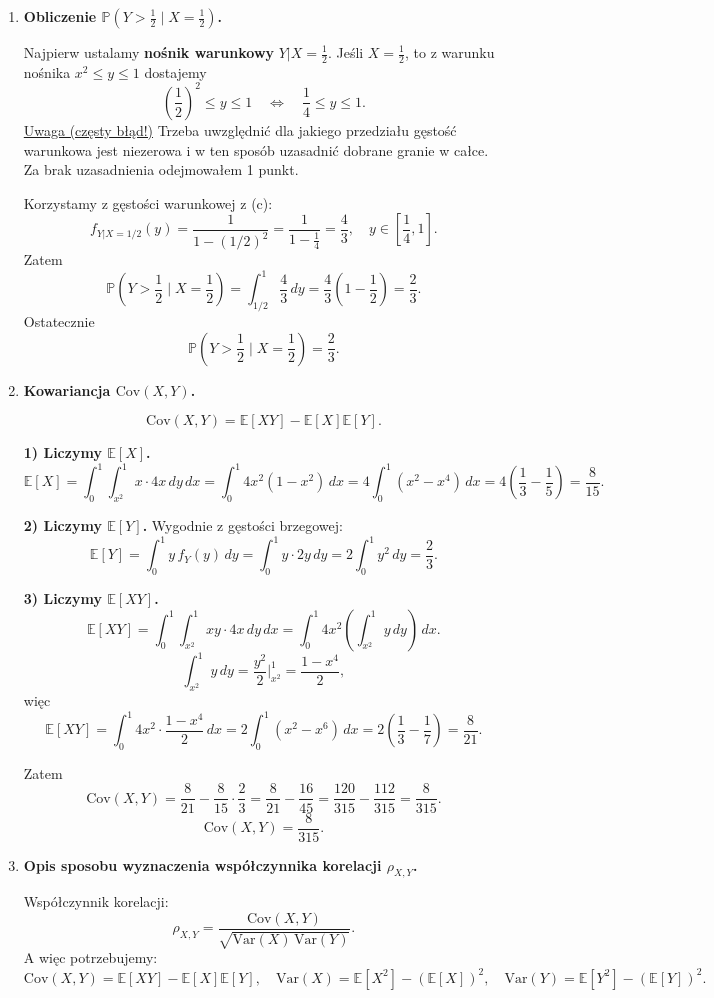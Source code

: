\documentclass[polish, 10pt]{extarticle}
\begin{document}
\begin{enumerate}
\item[d)] \textbf{Obliczenie $\mathbb{P}\!\left(Y>\frac12\mid X=\frac12\right)$.}

Najpierw ustalamy \textbf{nośnik warunkowy} $Y|X=\tfrac12$.
Jeśli $X=\tfrac12$, to z warunku nośnika $x^2\le y\le 1$ dostajemy
\[
\left(\frac12\right)^2\le y\le 1 \quad\Longleftrightarrow\quad \frac14\le y\le 1.
\]
\underline{Uwaga (częsty błąd!)} Trzeba uwzględnić dla jakiego przedziału gęstość warunkowa jest niezerowa i w ten sposób uzasadnić dobrane granie w całce. Za brak uzasadnienia odejmowałem 1 punkt.

Korzystamy z gęstości warunkowej z (c):
\[
f_{Y|X=1/2}(y)=\frac{1}{1-(1/2)^2}=\frac{1}{1-\frac14}=\frac{4}{3},
\quad y\in\left[\frac14,1\right].
\]
Zatem
\[
\mathbb{P}\!\left(Y>\frac12\mid X=\frac12\right)
=\int_{1/2}^{1} \frac{4}{3}\,dy
=\frac{4}{3}\left(1-\frac12\right)=\frac{2}{3}.
\]
Ostatecznie
\[
\boxed{\mathbb{P}\!\left(Y>\frac12\mid X=\frac12\right)=\frac{2}{3}.}
\]

\item[e)] \textbf{Kowariancja $\mathrm{Cov}(X,Y)$.}

\[
\mathrm{Cov}(X,Y)=\mathbb{E}[XY]-\mathbb{E}[X]\mathbb{E}[Y].
\]

\smallskip
\textbf{1) Liczymy $\mathbb{E}[X]$.}
\[
\mathbb{E}[X]=\int_0^1\int_{x^2}^{1} x\cdot 4x\,dy\,dx
=\int_0^1 4x^2(1-x^2)\,dx
=4\int_0^1 (x^2-x^4)\,dx
=4\left(\frac13-\frac15\right)=\frac{8}{15}.
\]

\smallskip
\textbf{2) Liczymy $\mathbb{E}[Y]$.} Wygodnie z gęstości brzegowej:
\[
\mathbb{E}[Y]=\int_0^1 y\,f_Y(y)\,dy=\int_0^1 y\cdot 2y\,dy
=2\int_0^1 y^2\,dy=\frac{2}{3}.
\]

\smallskip
\textbf{3) Liczymy $\mathbb{E}[XY]$.}
\[
\mathbb{E}[XY]=\int_0^1\int_{x^2}^{1} xy\cdot 4x\,dy\,dx
=\int_0^1 4x^2\left(\int_{x^2}^{1} y\,dy\right)\,dx.
\]
\[
\int_{x^2}^{1} y\,dy=\frac{y^2}{2}\Big|_{x^2}^{1}=\frac{1-x^4}{2},
\]
więc
\[
\mathbb{E}[XY]=\int_0^1 4x^2\cdot \frac{1-x^4}{2}\,dx
=2\int_0^1 (x^2-x^6)\,dx
=2\left(\frac13-\frac17\right)=\frac{8}{21}.
\]

\smallskip
Zatem
\[
\mathrm{Cov}(X,Y)=\frac{8}{21}-\frac{8}{15}\cdot\frac{2}{3}
=\frac{8}{21}-\frac{16}{45}
=\frac{120}{315}-\frac{112}{315}
=\frac{8}{315}.
\]
\[
\boxed{\mathrm{Cov}(X,Y)=\frac{8}{315}.}
\]

\item[f)] \textbf{Opis sposobu wyznaczenia współczynnika korelacji $\rho_{X,Y}$.}

Współczynnik korelacji:
\[
\rho_{X,Y}=\frac{\mathrm{Cov}(X,Y)}{\sqrt{\mathrm{Var}(X)\,\mathrm{Var}(Y)}}.
\]
A więc potrzebujemy:
\[
\mathrm{Cov}(X,Y)=\mathbb{E}[XY]-\mathbb{E}[X]\mathbb{E}[Y],
\quad
\mathrm{Var}(X)=\mathbb{E}[X^2]-(\mathbb{E}[X])^2,
\quad
\mathrm{Var}(Y)=\mathbb{E}[Y^2]-(\mathbb{E}[Y])^2.
\]


\end{enumerate}
\end{document}
